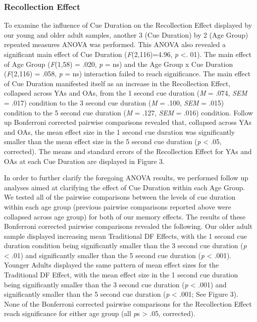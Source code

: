 \documentclass[man]{apa6}
\begin{document}
\subsubsection*{Recollection Effect}

To examine the influence of Cue Duration on the Recollection Effect displayed by our young and older adult samples, another 3 (Cue Duration) by 2 (Age Group) repeated measures ANOVA was performed. This ANOVA also revealed a significant main effect of Cue Duration (\textit{F}(2,116)=4.96, \textit{p} <. 01). The main effect of Age Group (\textit{F}(1,58) = .020, \textit{p} = ns) and the Age Group x Cue Duration (\textit{F}(2,116) = .058, \textit{p} = ns) interaction failed to reach significance. The main effect of Cue Duration manifested itself as an increase in the Recollection Effect, collapsed across YAs and OAs, from the 1 second cue duration (\textit{M} = .074, \textit{SEM} = .017) condition to the 3 second cue duration (\textit{M} = .100, \textit{SEM} = .015) condition to the 5 second cue duration (\textit{M} = .127, \textit{SEM} = .016) condition. Follow up Bonferroni corrected pairwise comparisons revealed that, collapsed across YAs and OAs, the mean effect size in the 1 second cue duration was significantly smaller than the mean effect size in the 5 second cue duration (\textit{p} < .05, corrected). The means and standard errors of the Recollection Effect for YAs and OAs at each Cue Duration are displayed in Figure 3.

In order to further clarify the foregoing ANOVA results, we performed follow up analyses aimed at clarifying the effect of Cue Duration within each Age Group. We tested all of the pairwise comparisons between the levels of cue duration within each age group (previous pairwise comparisons reported above were collapsed across age group) for both of our memory effects. The results of these Bonferroni corrected pairwise comparisons revealed the following. Our older adult sample displayed increasing mean Traditional DF Effects, with the 1 second cue duration condition being significantly smaller than the 3 second cue duration (\textit{p} < .01) and significantly smaller than the 5 second cue duration (\textit{p} < .001). Younger Adults displayed the same pattern of mean effect sizes for the Traditional DF Effect, with the mean effect size in the 1 second cue duration being significantly smaller than the 3 second cue duration (\textit{p} < .001) and significantly smaller than the 5 second cue duration (\textit{p} < .001; See Figure 3). None of the Bonferroni corrected pairwise comparisons for the Recollection Effect reach significance for either age group (all \textit{p}s > .05, corrected).
\end{document}
